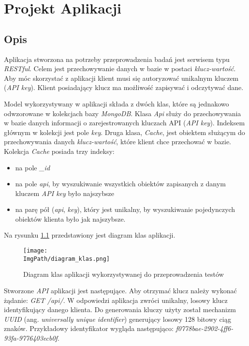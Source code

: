 \chapter{Projekt Aplikacji}
\section{Opis}
Aplikacja stworzona na potrzeby przeprowadzenia badań jest serwisem typu \textsl{RESTful}. Celem jest przechowywanie danych w bazie w postaci \textsl{klucz-wartość}. Aby móc skorzystać z aplikacji klient musi się autoryzować unikalnym kluczem (\textsl{API key}). Klient posiadający klucz ma możliwość zapisywać i odczytywać dane. 

Model wykorzystywany w aplikacji składa z dwóch klas, które są jednakowo odwzorowane w kolekcjach bazy \textsl{MongoDB}. Klasa \textsl{Api} służy do przechowywania w bazie danych informacji o zarejestrowanych kluczach API (\textsl{API key}). Indeksem głównym w kolekcji jest pole \textsl{key}.
Druga klasa, \textsl{Cache}, jest obiektem służącym do przechowywania danych \textsl{klucz-wartość}, które klient chce przechować w bazie. Kolekcja \textsl{Cache} posiada trzy indeksy:
\begin{itemize}
    \item na pole \textsl{\_id}
    \item na pole \textsl{api}, by wyszukiwanie wszystkich obiektów zapisanych z danym kluczem \textsl{API key} było najszybsze
    \item na parę pół (\textsl{api}, \textsl{key}), który jest unikalny, by wyszukiwanie pojedynczych obiektów klienta było jak najszybsze.
\end{itemize}
Na rysunku \ref{fig:class_diagram} przedstawiony jest diagram klas aplikacji. 
\begin{figure}[!ht]
\centering
\texttt{[image: \\ImgPath/diagram\_klas.png]}
\caption{Diagram klas aplikacji wykorzystywanej do przeprowadzenia testów}
\label{fig:class_diagram}
\end{figure}

Stworzone \textsl{API} aplikacji jest następujące. Aby otrzymać klucz należy wykonać żądanie: \textsl{GET /api/}. W odpowiedzi aplikacja zwróci unikalny, losowy klucz identyfikujący danego klienta. Do generowania kluczy użyty został mechanizm \textsl{UUID} (ang. \textsl{universally unique identifier}) generujący losowy 128 bitowy ciąg znaków. Przykładowy identyfikator wygląda następująco: \textsl{f0778bae-2902-4ff6-93fa-9776403ecb0f}.

